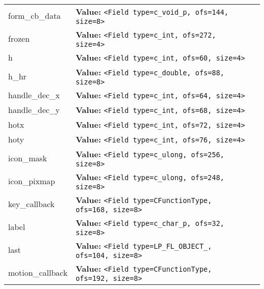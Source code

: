 \begin{longtable}{|p{\varnamewidth}|p{\vardescrwidth}|l}
\cline{1-2}
\raggedright f\-o\-r\-m\-\_\-c\-b\-\_\-d\-a\-t\-a\- & \raggedright \textbf{Value:} 
{\tt {\textless}Field type=c\_void\_p, ofs=144, size=8{\textgreater}}&\\
\cline{1-2}
\raggedright f\-r\-o\-z\-e\-n\- & \raggedright \textbf{Value:} 
{\tt {\textless}Field type=c\_int, ofs=272, size=4{\textgreater}}&\\
\cline{1-2}
\raggedright h\- & \raggedright \textbf{Value:} 
{\tt {\textless}Field type=c\_int, ofs=60, size=4{\textgreater}}&\\
\cline{1-2}
\raggedright h\-\_\-h\-r\- & \raggedright \textbf{Value:} 
{\tt {\textless}Field type=c\_double, ofs=88, size=8{\textgreater}}&\\
\cline{1-2}
\raggedright h\-a\-n\-d\-l\-e\-\_\-d\-e\-c\-\_\-x\- & \raggedright \textbf{Value:} 
{\tt {\textless}Field type=c\_int, ofs=64, size=4{\textgreater}}&\\
\cline{1-2}
\raggedright h\-a\-n\-d\-l\-e\-\_\-d\-e\-c\-\_\-y\- & \raggedright \textbf{Value:} 
{\tt {\textless}Field type=c\_int, ofs=68, size=4{\textgreater}}&\\
\cline{1-2}
\raggedright h\-o\-t\-x\- & \raggedright \textbf{Value:} 
{\tt {\textless}Field type=c\_int, ofs=72, size=4{\textgreater}}&\\
\cline{1-2}
\raggedright h\-o\-t\-y\- & \raggedright \textbf{Value:} 
{\tt {\textless}Field type=c\_int, ofs=76, size=4{\textgreater}}&\\
\cline{1-2}
\raggedright i\-c\-o\-n\-\_\-m\-a\-s\-k\- & \raggedright \textbf{Value:} 
{\tt {\textless}Field type=c\_ulong, ofs=256, size=8{\textgreater}}&\\
\cline{1-2}
\raggedright i\-c\-o\-n\-\_\-p\-i\-x\-m\-a\-p\- & \raggedright \textbf{Value:} 
{\tt {\textless}Field type=c\_ulong, ofs=248, size=8{\textgreater}}&\\
\cline{1-2}
\raggedright k\-e\-y\-\_\-c\-a\-l\-l\-b\-a\-c\-k\- & \raggedright \textbf{Value:} 
{\tt {\textless}Field type=CFunctionType, ofs=168, size=8{\textgreater}}&\\
\cline{1-2}
\raggedright l\-a\-b\-e\-l\- & \raggedright \textbf{Value:} 
{\tt {\textless}Field type=c\_char\_p, ofs=32, size=8{\textgreater}}&\\
\cline{1-2}
\raggedright l\-a\-s\-t\- & \raggedright \textbf{Value:} 
{\tt {\textless}Field type=LP\_FL\_OBJECT\_, ofs=104, size=8{\textgreater}}&\\
\cline{1-2}
\raggedright m\-o\-t\-i\-o\-n\-\_\-c\-a\-l\-l\-b\-a\-c\-k\- & \raggedright \textbf{Value:} 
{\tt {\textless}Field type=CFunctionType, ofs=192, size=8{\textgreater}}&\\

\end{longtable}
